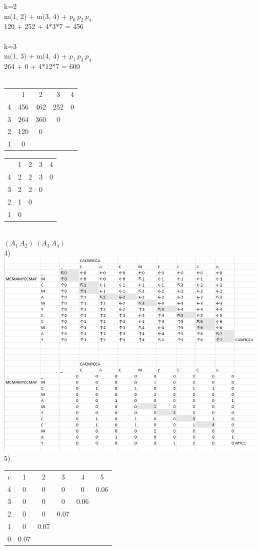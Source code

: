 \documentclass{article}
\begin{document}
    k=2 \\
    m(1, 2) + m(3, 4) + $ p_{0}\ p_{2}\  p_{4}$\\
    120 + 252 + 4*3*7 = 456\\\\

    k=3 \\
    m(1, 3) + m(4, 4) + $ p_{1}\ p_{3}\  p_{4}$\\
    264 + 0 + 4*12*7 = 600\\\\

    \begin{tabular}{ c | c | c | c | c }
            
        & 1 & 2 & 3 & 4 \\ 
    4 & 456 & 462 & 252 & 0 \\  
    3 & 264 & 360 & 0 \\
    2 & 120 & 0 \\
    1 & 0     
    \end{tabular}
    \begin{tabular}{ c | c | c | c | c }
            
        & 1 & 2 & 3 & 4 \\ 
      4 & 2 & 2 & 3 & 0 \\  
      3 & 2 & 2 & 0 \\
      2 & 1 & 0 \\
      1 & 0     
    \end{tabular}\\
 $ (A_{1} \  A_{2}) \  (A_{3} \ A_{4}) $\\
 4)   
    \includegraphics[scale=0.5]{subsequence.png}
5)\\
\begin{tabular}{ c | c | c | c | c | c}         
c & 1 & 2 & 3 & 4 & 5 \\ 
4 & 0 & 0 & 0 & 0 & 0.06 \\  
3 & 0 & 0 & 0 & 0.06 \\
2 & 0 & 0 & 0.07 \\
1 & 0 & 0.07 \\   
0 & 0.07     
\end{tabular}
\end{document}
